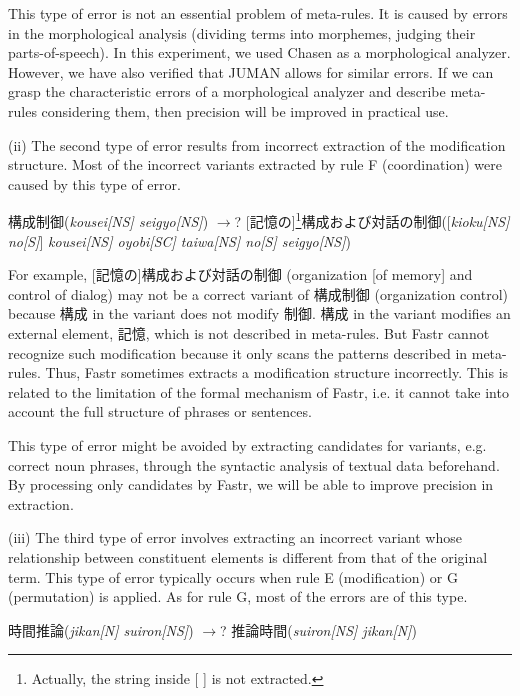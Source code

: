 This type of error is not an essential problem of meta-rules. It is caused by errors in the morphological analysis (dividing terms into morphemes, judging their parts-of-speech). In this experiment, we used Chasen as a morphological analyzer. However, we have also verified that JUMAN allows for similar errors. If we can grasp the characteristic errors of a morphological analyzer and describe meta-rules considering them, then precision will be improved in practical use.

\vspace{5mm}
\noindent
(ii) The second type of error results from incorrect extraction of the modification structure. Most of the incorrect variants extracted by rule F (coordination) were caused by this type of error.

\vspace{5mm}
\noindent
構成制御({\it kousei[NS] seigyo[NS]}) $\rightarrow$? [記憶の]\footnote{Actually, the string inside [ ] is not extracted.}構成および対話の制御([{\it kioku[NS] no[S]}] {\it kousei[NS] oyobi[SC] taiwa[NS] no[S] seigyo[NS]})

\vspace{5mm}
\noindent
For example, [記憶の]構成および対話の制御 (organization [of memory] and control of dialog) may not be a correct variant of 構成制御 (organization control) because 構成 in the variant does not modify 制御. 構成 in the variant modifies an external element, 記憶, which is not described in meta-rules. But Fastr cannot recognize such modification because it only scans the patterns described in meta-rules. Thus, Fastr sometimes extracts a modification structure incorrectly. This is related to the limitation of the formal mechanism of Fastr, i.e. it cannot take into account the full structure of phrases or sentences.

This type of error might be avoided by extracting candidates for variants, e.g. correct noun phrases, through the syntactic analysis of textual data beforehand. By processing only candidates by Fastr, we will be able to improve precision in extraction.

\vspace{5mm}
\noindent
(iii) The third type of error involves extracting an incorrect variant whose relationship between constituent elements is different from that of the original term. This type of error typically occurs when rule E (modification) or G (permutation) is applied. As for rule G, most of the errors are of this type.

\vspace{5mm}
\noindent
時間推論({\it jikan[N] suiron[NS]}) $\rightarrow$? 推論時間({\it suiron[NS] jikan[N]})

